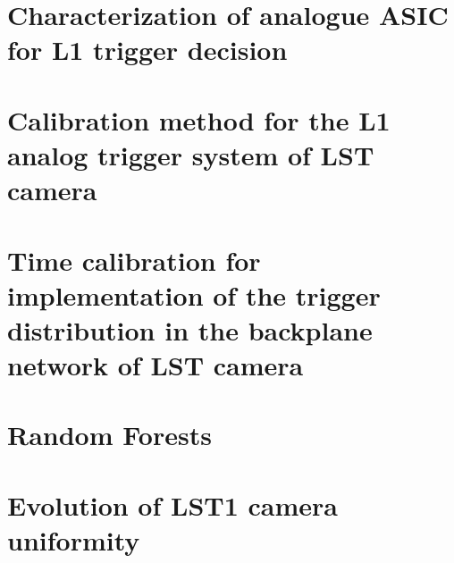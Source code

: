 \documentclass[12pt,fleqn]{book} %
\begin{document}
\chapter[Characterization of analogue ASIC for L1 trigger decision]{Characterization of analogue ASIC for L1 trigger decision}
\label{app:asic}


\chapter[Calibration method for the L1 analog trigger system of LST camera]{Calibration method for the L1 analog trigger system of LST camera}
\label{app:calib}


\chapter[Time calibration for implementation of the trigger distribution in the backplane network of LST camera]{Time calibration for implementation of the trigger distribution in the backplane network of LST camera}
\label{app:timecal}


\chapter[Random Forests]{Random Forests}
\label{app:rf}


\chapter[Evolution of LST1 camera uniformity]{Evolution of LST1 camera uniformity}
\label{app:lstcamevo}


\printbibliography
\printglossaries
\end{document}

